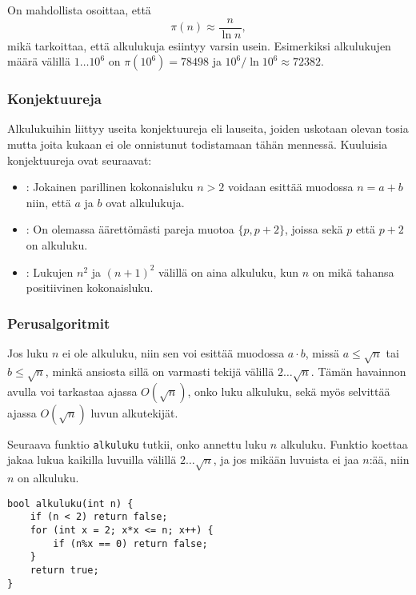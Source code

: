 On mahdollista osoittaa, että
\[\pi(n) \approx \frac{n}{\ln n},\]
mikä tarkoittaa, että alkulukuja esiintyy
varsin usein. Esimerkiksi alkulukujen määrä
välillä $1 \ldots 10^6$ on $\pi(10^6)=78498$
ja $10^6 / \ln 10^6 \approx 72382$.

\subsubsection{Konjektuureja}

Alkulukuihin liittyy useita konjektuureja
eli lauseita, joiden uskotaan olevan tosia mutta
joita kukaan ei ole onnistunut todistamaan tähän mennessä.
Kuuluisia konjektuureja ovat seuraavat:

\begin{itemize}
\item {}:
Jokainen parillinen kokonaisluku $n>2$ voidaan esittää
muodossa $n=a+b$ niin, että $a$ ja $b$
ovat alkulukuja.
\item {}:
On olemassa äärettömästi pareja muotoa $\{p,p+2\}$,
joissa sekä $p$ että $p+2$ on alkuluku.
\item {}:
Lukujen $n^2$ ja $(n+1)^2$ välillä on aina alkuluku,
kun $n$ on mikä tahansa positiivinen kokonaisluku.
\end{itemize}

\subsubsection{Perusalgoritmit}

Jos luku $n$ ei ole alkuluku,
niin sen voi esittää muodossa $a \cdot b$,
missä $a \le \sqrt n$ tai $b \le \sqrt n$,
minkä ansiosta sillä on varmasti
tekijä välillä $2 \ldots \sqrt n$.
Tämän havainnon avulla voi tarkastaa ajassa $O(\sqrt n)$,
onko luku alkuluku,
sekä myös selvittää ajassa $O(\sqrt n)$
luvun alkutekijät.

Seuraava funktio \texttt{alkuluku} tutkii,
onko annettu luku $n$ alkuluku.
Funktio koettaa jakaa lukua kaikilla luvuilla
välillä $2 \ldots \sqrt n$, ja jos mikään
luvuista ei jaa $n$:ää, niin $n$ on alkuluku.

\begin{lstlisting}
bool alkuluku(int n) {
    if (n < 2) return false;
    for (int x = 2; x*x <= n; x++) {
        if (n%x == 0) return false;
    }
    return true;
}
\end{lstlisting}

